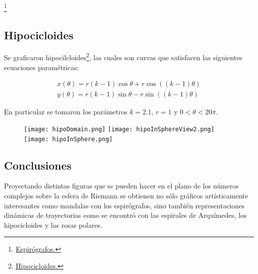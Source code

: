 \documentclass[a4paper,12pt]{article}
\begin{document}
    \footnote{\textcolor{blueMacc}{\underline{\href{https://en.wikipedia.org/wiki/Spirograph}{Espirógrafos.}}}} 
    
    \newpage
    \subsection{Hipocicloides}
    Se graficaron hipocilcloides\footnote{\textcolor{blueMacc}{\underline{\href{https://en.wikipedia.org/wiki/Hypocycloid}{Hipocicloides.}}}}, las cuales son curvas que satisfacen las siguientes ecuaciones paramétricas:
    
    \begin{align*}
        x(\theta) = r(k-1)\cos \theta + r \cos ((k-1)\theta) \\
        y(\theta) = r(k-1)\sin \theta - r \sin ((k-1)\theta)
    \end{align*}
    
    En particular se tomaron los parámetros $k = 2.1$, $r = 1$ y $0 < \theta < 20\pi$.
    
    \begin{figure}[H]
        \centering
        \texttt{[image: hipoDomain.png]}
        \texttt{[image: hipoInSphereView2.png]}
        \texttt{[image: hipoInSphere.png]}
    \end{figure}
    
    \subsection{Conclusiones}
    Proyectando distintas figuras que se pueden hacer en el plano de los números complejos sobre la esfera de Riemann se obtienen no sólo gráficos artísticamente interesantes como mandalas con los espirógrafos, sino también representaciones dinámicas de trayectorias como se encontró con las espirales de Arquímedes, los hipocicloides y las rosas polares.
    
\end{document}
